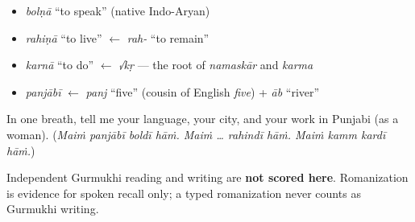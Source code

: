 \begin{cousinweb}
\begin{itemize}
\raggedright
  \item \emph{bolṇā} \textquotedblleft{}to speak\textquotedblright{} (native Indo-Aryan)
  \item \emph{rahiṇā} \textquotedblleft{}to live\textquotedblright{} $\leftarrow$ \emph{rah-} \textquotedblleft{}to remain\textquotedblright{}
  \item \emph{karnā} \textquotedblleft{}to do\textquotedblright{} $\leftarrow$ \emph{√kṛ} — the root of \emph{namaskār} and \emph{karma}
  \item \emph{panjābī} $\leftarrow$ \emph{panj} \textquotedblleft{}five\textquotedblright{} (cousin of English \emph{five}) + \emph{āb} \textquotedblleft{}river\textquotedblright{}
\end{itemize}
\end{cousinweb}

\begin{tcolorbox}[breakable,colback=teal!4,colframe=teal!35!black,title={Before you move on}]
In one breath, tell me your language, your city, and your work in Punjabi (as a woman). (\emph{Maiṁ panjābī boldī hāṁ. Maiṁ … rahindī hāṁ. Maiṁ kamm kardī hāṁ.})

Independent Gurmukhi reading and writing are \textbf{not scored here}. Romanization is evidence for spoken recall only; a typed romanization never counts as Gurmukhi writing.
\end{tcolorbox}
